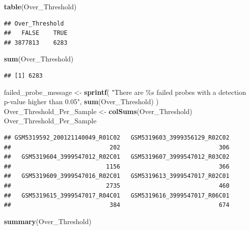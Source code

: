 \documentclass[
  11pt,
]{article}
\newenvironment{Shaded}{\begin{snugshade}}{\end{snugshade}}
\newcommand{\FunctionTok}[1]{\textcolor[rgb]{0.13,0.29,0.53}{\textbf{#1}}}
\newcommand{\NormalTok}[1]{#1}
\newcommand{\OtherTok}[1]{\textcolor[rgb]{0.56,0.35,0.01}{#1}}
\newcommand{\StringTok}[1]{\textcolor[rgb]{0.31,0.60,0.02}{#1}}
\begin{document}
\begin{Shaded}
\begin{Highlighting}[]
\FunctionTok{table}\NormalTok{(Over\_Threshold)}
\end{Highlighting}
\end{Shaded}

\begin{verbatim}
## Over_Threshold
##   FALSE    TRUE 
## 3877813    6283
\end{verbatim}

\begin{Shaded}
\begin{Highlighting}[]
\FunctionTok{sum}\NormalTok{(Over\_Threshold)}
\end{Highlighting}
\end{Shaded}

\begin{verbatim}
## [1] 6283
\end{verbatim}

\begin{Shaded}
\begin{Highlighting}[]
\NormalTok{failed\_probe\_message }\OtherTok{\textless{}{-}} \FunctionTok{sprintf}\NormalTok{(}
  \StringTok{"There are \%s failed probes with a detection p{-}value higher than 0.05"}\NormalTok{,}
  \FunctionTok{sum}\NormalTok{(Over\_Threshold)}
\NormalTok{)}
\NormalTok{Over\_Threshold\_Per\_Sample }\OtherTok{\textless{}{-}} \FunctionTok{colSums}\NormalTok{(Over\_Threshold)}
\NormalTok{Over\_Threshold\_Per\_Sample}
\end{Highlighting}
\end{Shaded}

\begin{verbatim}
## GSM5319592_200121140049_R01C02   GSM5319603_3999356129_R02C02 
##                            202                            306 
##   GSM5319604_3999547012_R02C01   GSM5319607_3999547012_R03C02 
##                           1156                            366 
##   GSM5319609_3999547016_R02C01   GSM5319613_3999547017_R02C01 
##                           2735                            460 
##   GSM5319615_3999547017_R04C01   GSM5319616_3999547017_R06C01 
##                            384                            674
\end{verbatim}

\begin{Shaded}
\begin{Highlighting}[]
\FunctionTok{summary}\NormalTok{(Over\_Threshold)}
\end{Highlighting}
\end{Shaded}
\end{document}
